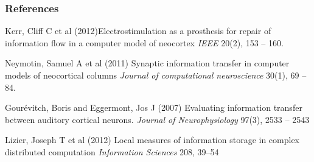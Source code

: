 \documentclass{beamer}
\begin{document}













\begin{frame}
\nocite{*}
\frametitle{References}
\footnotesize{
\begin{thebibliography}{99} 
\fontsize{11pt}{11pt}\selectfont
{} Kerr, Cliff C et al (2012)\newblock Electrostimulation as a prosthesis for repair of information flow in a computer model of neocortex
\newblock \emph{IEEE} 20(2), 153 -- 160.

 Neymotin, Samuel A et al (2011)
\newblock Synaptic information transfer in computer models of neocortical columns
\newblock \emph{Journal of computational neuroscience} 30(1), 69 -- 84.

 Gour{\'e}vitch, Boris and Eggermont, Jos J  (2007)		
\newblock Evaluating information transfer between auditory cortical neurons.
\newblock \emph{Journal of Neurophysiology} 97(3), 2533 -- 2543	

 Lizier, Joseph T  et al (2012)
\newblock Local measures of information storage in complex distributed computation
  \newblock \emph{Information Sciences} 208, 39--54



\end{thebibliography}
}




\end{frame}
\end{document}
